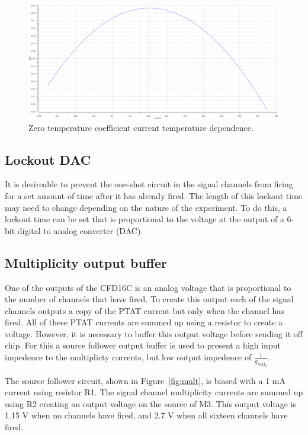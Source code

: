 \documentclass[12pt,oneside,final]{siuethesis}
\theoremstyle{definition}
\begin{document}
\begin{figure}[htbp!]
\centering
\includegraphics[scale=.3,keepaspectratio=true]{../data/ztc.png} 
\caption{Zero temperature coefficient current temperature dependence.}
\label{fig:ztc-temp}
\end{figure}

\subsection{Lockout DAC}
\par It is desireable to prevent the one-shot circuit in the signal channels from firing for a set amount of time after it has already fired. The length of this lockout time may need to change depending on the nature of the experiment. To do this, a lockout time can be set that is proportional to the voltage at the output of a 6-bit digital to analog converter (DAC). 

\subsection{Multiplicity output buffer}
\par One of the outputs of the CFD16C is an analog voltage that is proportional to the number of channels that have fired. To create this output each of the signal channels outputs a copy of the PTAT current but only when the channel has fired. All of these PTAT currents are summed up using a resistor to create a voltage. However, it is necessary to buffer this output voltage before sending it off chip. For this a source follower output buffer is used to present a high input impedence to the multiplicty currents, but low output impedence of $\frac{1}{g_{m M_{2}}}$. 
\par The source follower circuit, shown in Figure~\ref{fig:mult}, is biased with a 1 mA current using resistor R1. The signal channel multiplicity currents are summed up using R2 creating an output voltage on the source of M3. This output voltage is 1.15 V when no channels have fired, and 2.7 V when all sixteen channels have fired. 
\end{document}

